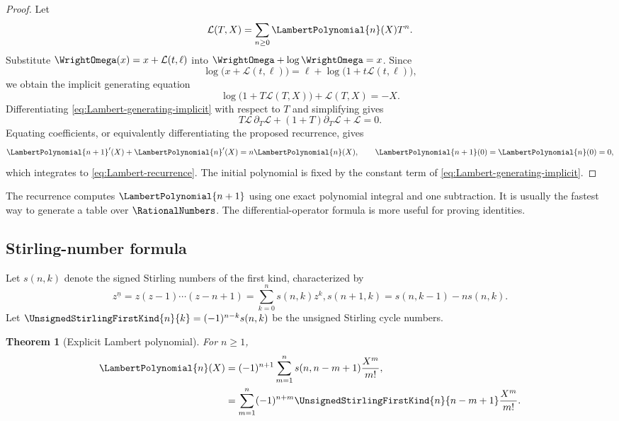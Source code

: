 \documentclass[11pt,oneside]{article}
\numberwithin{equation}{section}
\newtheorem{theorem}{Theorem}[section]
\theoremstyle{definition}
\begin{document}
\begin{proof}
Let
\begin{equation}\label{eq:Lambert-generating-F}
  \mathcal L(T,X)=\sum_{n\ge0}\LambertPolynomial{n}(X)T^n.
\end{equation}
Substitute \(\WrightOmega(x)=x+\mathcal L(t,\ell)\) into
\(\WrightOmega+\log\WrightOmega=x\).  Since
\[
  \log\bigl(x+\mathcal L(t,\ell)\bigr)
  =\ell+\log\bigl(1+t\mathcal L(t,\ell)\bigr),
\]
we obtain the implicit generating equation
\begin{equation}\label{eq:Lambert-generating-implicit}
\boxed{
  \log\bigl(1+T\mathcal L(T,X)\bigr)
  +\mathcal L(T,X)=-X.
}
\end{equation}
Differentiating \eqref{eq:Lambert-generating-implicit} with respect to \(T\)
and simplifying gives
\begin{equation}\label{eq:Lambert-generating-ODE}
  T\mathcal L\,\partial_T\mathcal L
  +(1+T)\partial_T\mathcal L+\mathcal L=0.
\end{equation}
Equating coefficients, or equivalently differentiating the proposed recurrence,
gives
\[
  \LambertPolynomial{n+1}'(X)+\LambertPolynomial{n}'(X)=n\LambertPolynomial{n}(X),
  \qquad \LambertPolynomial{n+1}(0)=\LambertPolynomial{n}(0)=0,
\]
which integrates to \eqref{eq:Lambert-recurrence}.  The initial polynomial is
fixed by the constant term of \eqref{eq:Lambert-generating-implicit}.
\end{proof}

The recurrence computes \(\LambertPolynomial{n+1}\) using one exact polynomial integral and one
subtraction.  It is usually the fastest way to generate a table over \(\RationalNumbers\).
The differential-operator formula is more useful for proving identities.

\subsection{Stirling-number formula}

Let \(s(n,k)\) denote the signed Stirling numbers of the first kind,
characterized by
\[
  z^{\underline n}=z(z-1)\cdots(z-n+1)
  =\sum_{k=0}^n s(n,k)z^k,
  s(n+1,k)=s(n,k-1)-n s(n,k).
\]
Let \(\UnsignedStirlingFirstKind{n}{k}=(-1)^{n-k}s(n,k)\) be the unsigned Stirling cycle
numbers.

\begin{theorem}[Explicit Lambert polynomial]\label{thm:Lambert-Stirling}
For \(n\ge1\),
\begin{align}
  \LambertPolynomial{n}(X)
  &=(-1)^{n+1}\sum_{m=1}^{n}
       s(n,n-m+1)\frac{X^m}{m!},
       \label{eq:Ln-signed-Stirling}\\
  &=\sum_{m=1}^{n}(-1)^{n+m}
       \UnsignedStirlingFirstKind{n}{n-m+1}\frac{X^m}{m!}.
       \label{eq:Ln-unsigned-Stirling}
\end{align}
\end{theorem}
\end{document}
